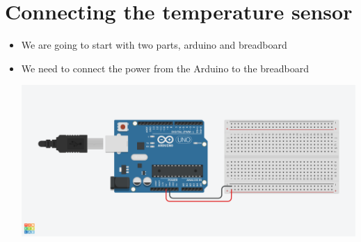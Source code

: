 \documentclass[12pt]{article}
\begin{document}
\section *{Connecting the temperature sensor}
	\begin{itemize}
		\item We are going to start with two parts, arduino and breadboard 
		\item We need to connect the power from the Arduino to the breadboard
		\begin{center}
    		\includegraphics[scale = 0.3]{./Images/circuit1}
		\end{center}
		

\end{itemize}
\end{document}
